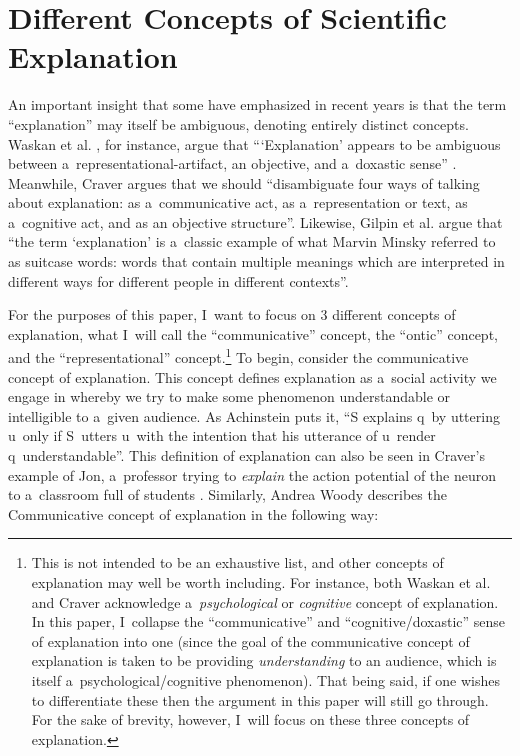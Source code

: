 \section{Different Concepts of Scientific Explanation}
An important insight that some have emphasized in recent years is that the term ``explanation'' may itself be ambiguous, denoting entirely distinct concepts. Waskan et al.
\parencite*[][]{izadi_building_2014}, %
 for instance, argue that ``‘Explanation' appears to be ambiguous between a~representational-artifact, an objective, and a~doxastic sense'' 
\parencite[][p.3090]{bello_three_2014}. %
 Meanwhile, Craver 
\parencite*[][p.29]{kaiser_ontic_2014} %
 argues that we should ``disambiguate four ways of talking about explanation: as a~communicative act, as a~representation or text, as a~cognitive act, and as an objective structure''. Likewise, Gilpin et al. 
\parencite*[][p.3]{gilpin_explanation_2022} %
 argue that ``the term ‘explanation' is a~classic example of what Marvin Minsky referred to as suitcase words: words that contain multiple meanings which are interpreted in different ways for different people in different contexts''.

For the purposes of this paper, I~want to focus on 3 different concepts of explanation, what I~will call the ``communicative'' concept, the ``ontic'' concept, and the ``representational'' concept.\footnote{This is not intended to be an exhaustive list, and other concepts of explanation may well be worth including. For instance, both Waskan et al. and Craver acknowledge a~\textit{psychological} or \textit{cognitive} concept of explanation. In this paper, I~collapse the ``communicative'' and ``cognitive/doxastic'' sense of explanation into one (since the goal of the communicative concept of explanation is taken to be providing \textit{understanding} to an audience, which is itself a~psychological/cognitive phenomenon). That being said, if one wishes to differentiate these then the argument in this paper will still go through. For the sake of brevity, however, I~will focus on these three concepts of explanation.} To begin, consider the communicative concept of explanation. This concept defines explanation as a~social activity we engage in whereby we try to make some phenomenon understandable or intelligible to a~given audience. As Achinstein
\parencite*[][pp.16–17]{achinstein_nature_1983} %
 puts it, ``S explains q~by uttering u~only if S~utters u~with the intention that his utterance of u~render q~understandable''. This definition of explanation can also be seen in Craver's example of Jon, a~professor trying to \textit{explain} the action potential of the neuron to a~classroom full of students 
\parencite[][p.30]{kaiser_ontic_2014}. %
 Similarly, Andrea Woody describes the Communicative concept of explanation in the following way:

